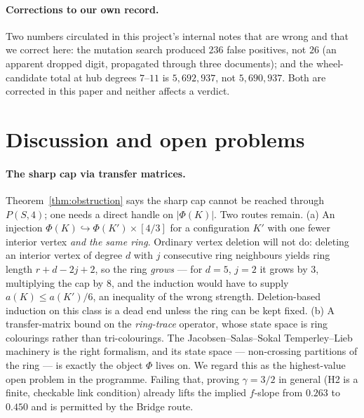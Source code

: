 \documentclass[11pt]{article}
\theoremstyle{definition}
\begin{document}
\paragraph{Corrections to our own record.} Two numbers circulated in this project's
internal notes that are wrong and that we correct here: the mutation search produced
$236$ false positives, not $26$ (an apparent dropped digit, propagated through three
documents); and the wheel-candidate total at hub degrees $7$--$11$ is $5{,}692{,}937$,
not $5{,}690{,}937$. Both are corrected in this paper and neither affects a verdict.

\section{Discussion and open problems}
\label{sec:open}

\paragraph{The sharp cap via transfer matrices.} Theorem~\ref{thm:obstruction} says
the sharp cap cannot be reached through $P(S,4)$; one needs a direct handle on
$|\Phi(K)|$. Two routes remain. (a) An injection
$\Phi(K) \hookrightarrow \Phi(K')\times[4/3]$ for a configuration $K'$ with one fewer
interior vertex \emph{and the same ring}. Ordinary vertex deletion will not do:
deleting an interior vertex of degree $d$ with $j$ consecutive ring neighbours yields
ring length $r+d-2j+2$, so the ring \emph{grows} --- for $d=5$, $j=2$ it grows by $3$,
multiplying the cap by $8$, and the induction would have to supply
$a(K)\le a(K')/6$, an inequality of the wrong strength. Deletion-based induction on
this class is a dead end unless the ring can be kept fixed. (b) A transfer-matrix
bound on the \emph{ring-trace} operator, whose state space is ring colourings rather
than tri-colourings. The Jacobsen--Salas--Sokal Temperley--Lieb machinery
\cite{jacobsen2006} is the right formalism, and its state space --- non-crossing
partitions of the ring --- is exactly the object $\Phi$ lives on. We regard this as
the highest-value open problem in the programme. Failing that, proving $\gamma=3/2$
in general (H2 is a finite, checkable link condition) already lifts the implied
$f$-slope from $0.263$ to $0.450$ and is permitted by the Bridge route.
\end{document}
